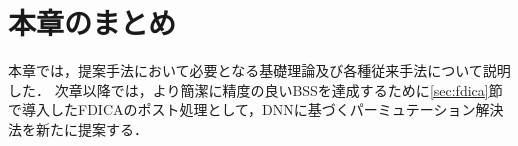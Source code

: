 \section{本章のまとめ}
本章では，提案手法において必要となる基礎理論及び各種従来手法について説明した．
次章以降では，より簡潔に精度の良いBSSを達成するために\ref{sec:fdica}節で導入したFDICAのポスト処理として，DNNに基づくパーミュテーション解決法を新たに提案する．
















